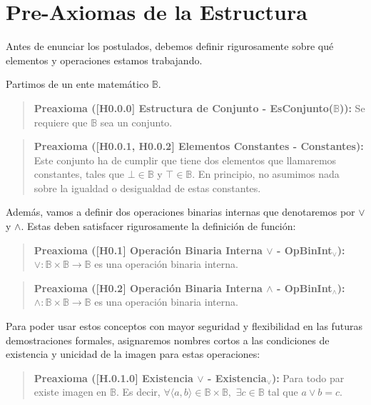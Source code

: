\section{Pre-Axiomas de la Estructura}
Antes de enunciar los postulados, debemos definir rigurosamente sobre qué elementos y operaciones estamos trabajando. 

Partimos de un ente matemático $\mathbb{B}.$

\begin{quote}\textbf{Preaxioma ([H0.0.0] Estructura de Conjunto - EsConjunto($\mathbb{B}$)):}\label{esconj}
Se requiere que $\mathbb{B}$ sea un conjunto.
\end{quote}

\begin{quote}\textbf{Preaxioma ([H0.0.1, H0.0.2] Elementos Constantes - Constantes):}\label{constantes}
Este conjunto ha de cumplir que tiene dos elementos que llamaremos constantes, tales que $\bot \in \mathbb{B}$ y $\top \in \mathbb{B}.$ En principio, no asumimos nada sobre la igualdad o desigualdad de estas constantes.
\end{quote}

Además, vamos a definir dos operaciones binarias internas que denotaremos por $\vee$ y $\wedge.$ Estas deben satisfacer rigurosamente la definición de función:

\begin{quote}\textbf{Preaxioma ([H0.1] Operación Binaria Interna $\vee$ - OpBinInt$_\vee$):}\label{opbinint_vee}
$\vee : \mathbb{B} \times \mathbb{B} \to \mathbb{B}$ es una operación binaria interna.
\end{quote}

\begin{quote}\textbf{Preaxioma ([H0.2] Operación Binaria Interna $\wedge$ - OpBinInt$_\wedge$):}\label{opbinint_wedge}
$\wedge : \mathbb{B} \times \mathbb{B} \to \mathbb{B}$ es una operación binaria interna.
\end{quote}

Para poder usar estos conceptos con mayor seguridad y flexibilidad en las futuras demostraciones formales, asignaremos nombres cortos a las condiciones de existencia y unicidad de la imagen para estas operaciones:

\begin{quote}\textbf{Preaxioma ([H.0.1.0] Existencia $\vee$ - Existencia$_\vee$):}\label{exist_vee}
Para todo par existe imagen en $\mathbb{B}.$ Es decir, $\forall \langle a,b \rangle \in \mathbb{B} \times \mathbb{B},$ $\exists c \in \mathbb{B}$ tal que $a \vee b = c.$
\end{quote}

